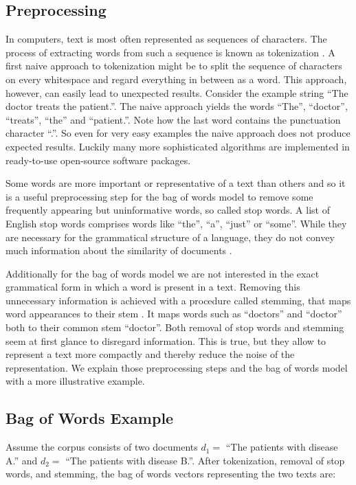 \subsection*{Preprocessing}
In computers, text is most often represented as sequences of characters. The process of extracting words from such a sequence is known as tokenization \citep{Manning2008prepr}. A first naive approach to tokenization might be to
split the sequence of characters on every whitespace and regard everything
in between as a word. This approach, however, can easily lead to unexpected
results. Consider the example string ``The doctor treats the patient.''. The naive
approach yields the words ``The'', ``doctor'', ``treats'', ``the'' and ``patient.''.
Note how the last word contains the punctuation character ``.''.
So even for very easy examples the naive approach does not produce
expected results. Luckily many more sophisticated algorithms are implemented
in ready-to-use open-source software packages.

Some words are more important or representative of a text than others and so it is a useful preprocessing step for the bag of words model to remove some frequently appearing but uninformative words, so called stop words. A list of English stop words comprises words like ``the'', ``a'', ``just'' or ``some''.  While they are necessary for the
grammatical structure of a language, they do not convey much information
about the similarity of documents \citep{Manning2008prepr}.

Additionally for the bag of words model we are not interested in the exact grammatical form in which a word is present in a text. Removing this unnecessary information is achieved with a procedure called stemming, that maps word appearances to their stem \citep{Manning2008prepr}. It maps words such as ``doctors'' and ``doctor'' both to their common stem ``doctor''. Both removal of stop words and stemming seem at first glance to disregard information. This is true, but they allow to represent a text more compactly and thereby reduce the noise of the representation. We explain those preprocessing steps and the bag of words model with a more illustrative example.

\subsection*{Bag of Words Example}
Assume the corpus consists of two documents $d_{1}=$ ``The patients with disease A.'' and $d_{2}=$ ``The patients with disease B.''. After tokenization, removal of stop words, and stemming, the bag of words vectors representing the two texts are:

